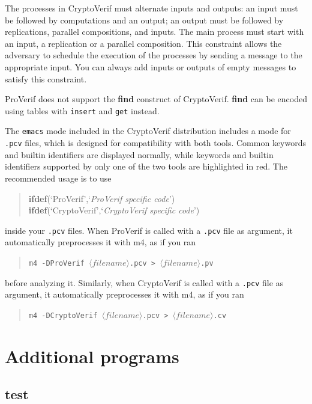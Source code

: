 \documentclass{book}
\newcommand{\nonterm}[1]{\langle\mathit{#1}\rangle}
\newcommand{\filenamevar}{\nonterm{filename}}
\begin{document}
The processes in CryptoVerif must alternate inputs and outputs:
an input must be followed by computations and an output;
an output must be followed by replications, parallel compositions,
and inputs. The main process must start with an input, a replication
or a parallel composition. This constraint allows the adversary to schedule
the execution of the processes by sending a message to the appropriate
input. You can always add inputs or outputs of empty messages
to satisfy this constraint.

ProVerif does not support the {\bf find} construct of CryptoVerif.
{\bf find} can be encoded using tables with \lstinline!insert!
and \lstinline!get! instead.

The {\tt emacs} mode included in the CryptoVerif distribution
includes a mode for {\tt .pcv} files, which is designed for
compatibility with both tools. Common keywords and builtin identifiers
are displayed normally, while keywords and builtin identifiers
supported by only one of the two tools are highlighted in red.
%
The recommended usage is to use
\begin{quote}
{\bf ifdef}(`ProVerif',`\emph{ProVerif specific code}')\\
{\bf ifdef}(`CryptoVerif',`\emph{CryptoVerif specific code}')
\end{quote}
inside your {\tt .pcv} files. When ProVerif is called
with a {\tt .pcv} file as argument, it automatically
preprocesses it with m4, as if you ran
\begin{quote}
    \texttt{m4 -DProVerif $\filenamevar$.pcv > $\filenamevar$.pv}
\end{quote}
before analyzing it.
Similarly, when CryptoVerif is called
with a {\tt .pcv} file as argument, it automatically
preprocesses it with m4, as if you ran
\begin{quote}
    \texttt{m4 -DCryptoVerif $\filenamevar$.pcv > $\filenamevar$.cv}
\end{quote}

\section{Additional programs}



\subsection{\ttfamily test}
\end{document}
